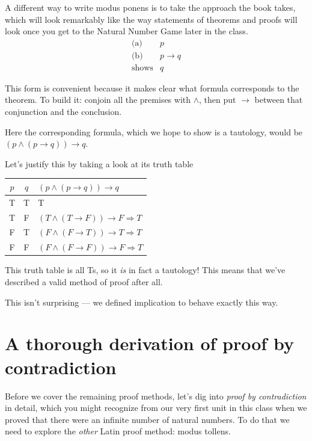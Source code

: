 \documentclass[11pt]{article}
\begin{document}
A different way to write modus ponens is to take the approach the book takes, which will look remarkably like the way statements of theorems and proofs will look once you get to the Natural Number Game later in the class.
\[
  \begin{array}{rl}
    \text{(a)} & p \\
    \text{(b)} & p \to q \\
    \hline
    \text{shows} & q
  \end{array}
\]

This form is convenient because it makes clear what formula corresponds to the theorem. To build it: conjoin all the premises with $\wedge$, then put $\to$ between that conjunction and the conclusion.

Here the corresponding formula, which we hope to show is a tautology, would be $(p \wedge (p \to q)) \to q$.

Let's justify this by taking a look at its truth table

\begin{center}
\begin{tabular}{ccl}
\toprule
$p$ & $q$ & $(p \wedge (p \to q)) \to q$ \\
\midrule
T & T & T \\
T & F & $(T \wedge (T \to F)) \to F \Longrightarrow T$ \\
F & T & $(F \wedge (F \to T)) \to T \Longrightarrow T$ \\
F & F & $(F \wedge (F \to F)) \to F \Longrightarrow T$ \\
\bottomrule
\end{tabular}
\end{center}

This truth table is all Ts, so it \emph{is} in fact a tautology! This means that we've described a valid method of proof after all.

This isn't surprising --- we defined implication to behave exactly this way.

\section{A thorough derivation of proof by contradiction}

Before we cover the remaining proof methods, let's dig into \emph{proof by contradiction} in detail, which you might recognize from our very first unit in this class when we proved that there were an infinite number of natural numbers. To do that we need to explore the \emph{other} Latin proof method: modus tollens.
\end{document}
